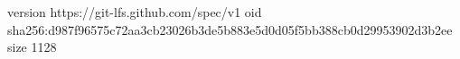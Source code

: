 version https://git-lfs.github.com/spec/v1
oid sha256:d987f96575c72aa3cb23026b3de5b883e5d0d05f5bb388cb0d29953902d3b2ee
size 1128
